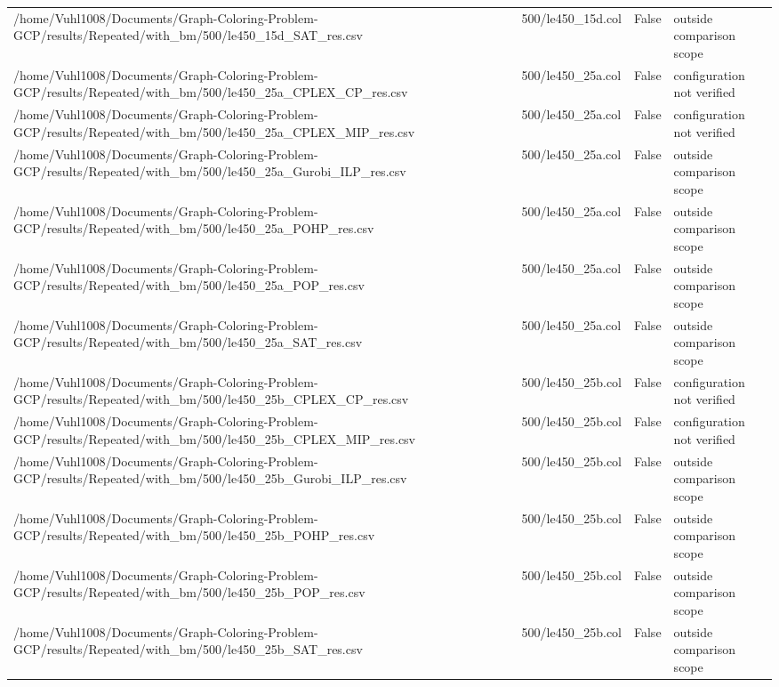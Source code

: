 \begin{table}[htbp]
\begin{tabular}{llll}
/home/Vuhl1008/Documents/Graph-Coloring-Problem-GCP/results/Repeated/with\_bm/500/le450\_15d\_SAT\_res.csv & 500/le450\_15d.col & False & outside comparison scope \\
/home/Vuhl1008/Documents/Graph-Coloring-Problem-GCP/results/Repeated/with\_bm/500/le450\_25a\_CPLEX\_CP\_res.csv & 500/le450\_25a.col & False & configuration not verified \\
/home/Vuhl1008/Documents/Graph-Coloring-Problem-GCP/results/Repeated/with\_bm/500/le450\_25a\_CPLEX\_MIP\_res.csv & 500/le450\_25a.col & False & configuration not verified \\
/home/Vuhl1008/Documents/Graph-Coloring-Problem-GCP/results/Repeated/with\_bm/500/le450\_25a\_Gurobi\_ILP\_res.csv & 500/le450\_25a.col & False & outside comparison scope \\
/home/Vuhl1008/Documents/Graph-Coloring-Problem-GCP/results/Repeated/with\_bm/500/le450\_25a\_POHP\_res.csv & 500/le450\_25a.col & False & outside comparison scope \\
/home/Vuhl1008/Documents/Graph-Coloring-Problem-GCP/results/Repeated/with\_bm/500/le450\_25a\_POP\_res.csv & 500/le450\_25a.col & False & outside comparison scope \\
/home/Vuhl1008/Documents/Graph-Coloring-Problem-GCP/results/Repeated/with\_bm/500/le450\_25a\_SAT\_res.csv & 500/le450\_25a.col & False & outside comparison scope \\
/home/Vuhl1008/Documents/Graph-Coloring-Problem-GCP/results/Repeated/with\_bm/500/le450\_25b\_CPLEX\_CP\_res.csv & 500/le450\_25b.col & False & configuration not verified \\
/home/Vuhl1008/Documents/Graph-Coloring-Problem-GCP/results/Repeated/with\_bm/500/le450\_25b\_CPLEX\_MIP\_res.csv & 500/le450\_25b.col & False & configuration not verified \\
/home/Vuhl1008/Documents/Graph-Coloring-Problem-GCP/results/Repeated/with\_bm/500/le450\_25b\_Gurobi\_ILP\_res.csv & 500/le450\_25b.col & False & outside comparison scope \\
/home/Vuhl1008/Documents/Graph-Coloring-Problem-GCP/results/Repeated/with\_bm/500/le450\_25b\_POHP\_res.csv & 500/le450\_25b.col & False & outside comparison scope \\
/home/Vuhl1008/Documents/Graph-Coloring-Problem-GCP/results/Repeated/with\_bm/500/le450\_25b\_POP\_res.csv & 500/le450\_25b.col & False & outside comparison scope \\
/home/Vuhl1008/Documents/Graph-Coloring-Problem-GCP/results/Repeated/with\_bm/500/le450\_25b\_SAT\_res.csv & 500/le450\_25b.col & False & outside comparison scope \\

\end{tabular}
\end{table}
